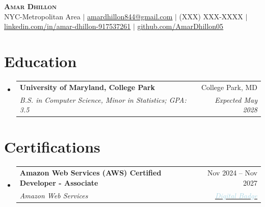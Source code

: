 \documentclass[letterpaper,10pt]{extarticle}
\makeatletter
\newcommand{\resumeSubheading}[4]{%
  \vspace{-2pt}\item
  \begin{tabular*}{0.97\textwidth}[t]{l@{\extracolsep{\fill}}r}
    \textbf{\small#1} & \small#2 \\
    \textit{\small#3} & \textit{\small #4} \\
  \end{tabular*}\vspace{-7pt}%
}
\newcommand{\resumeSubHeadingListStart}{\begin{itemize}[leftmargin=0.15in, label={}]}
\newcommand{\resumeSubHeadingListEnd}{\end{itemize}}
\newcommand{\resumeItemListStart}{\begin{itemize}}
\newcommand{\resumeItemListEnd}{\end{itemize}\vspace{-5pt}}
\makeatother
\begin{document}
\fontsize{8.5pt}{10pt}\selectfont




\begin{center}
    \textcolor{myblue}{\textbf{\fontsize{22}{26}\selectfont \scshape Amar Dhillon}} \\ \vspace{1pt}
    \footnotesize
    NYC-Metropolitan Area $|$
    \href{mailto:amardhillon844@gmail.com}{\underline{amardhillon844@gmail.com}} $|$
    (XXX) XXX-XXXX $|$
    \href{https://linkedin.com/in/amar-dhillon-917537261}{\underline{linkedin.com/in/amar-dhillon-917537261}} $|$
    \href{https://github.com/AmarDhillon05}{\underline{github.com/AmarDhillon05}}
\end{center}


\section{Education}
\vspace{3pt}
  \resumeSubHeadingListStart
    \resumeSubheading
      {University of Maryland, College Park}{College Park, MD}
      {B.S. in Computer Science, Minor in Statistics; GPA: 3.5}{Expected May 2028}
  \resumeSubHeadingListEnd


\section{Certifications}
\vspace{3pt}
\resumeSubHeadingListStart
  \resumeSubheading
    {Amazon Web Services (AWS) Certified Developer - Associate}{Nov 2024 -- Nov 2027}
    {Amazon Web Services}{{\href{https://www.credly.com/badges/d2406a97-d937-47de-823b-724981159d3b/public_url}
{\textcolor{lightblue}{Digital Badge}}}}
\resumeSubHeadingListEnd
\end{document}
